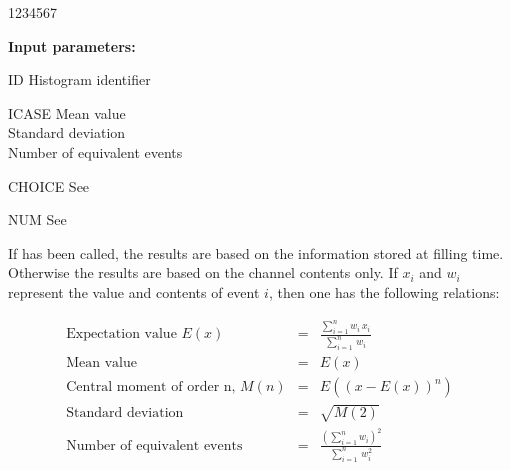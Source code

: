 \begin{DLtt}{1234567}
\item[{\rm\bf Input parameters:}]
\item[ID] Histogram identifier
\item[ICASE]  Mean value\\
              Standard deviation\\
              Number of equivalent events
\item[CHOICE] See 
\item[NUM] See 
\end{DLtt}
If 
has been called, the results are based on the
information stored at filling time.
Otherwise the results are based on the channel contents only.
If $x_i$ and $w_i$ represent the value and contents of event $i$, then
one has the following relations:

\bigskip

\begin{eqnarray*}
\mbox{Expectation value } E(x)          & = &
  \frac{\textstyle\sum_{i=1}^{n}w_i\, x_i}{\textstyle\sum_{i=1}^{n}\, w_i} \\
\mbox{Mean value}                       & = & E(x)                         \\
\mbox{Central moment of order n, } M(n) & = & E (( x - E(x))^n)            \\
\mbox{Standard deviation}               & = & \sqrt{M(2)}                  \\
\mbox{Number of equivalent events}      & = &
  \frac{\textstyle\left({\sum_{i=1}^n}{w_i}\right)^2}%
       {\textstyle\sum_{i=1}^n\, w_i^2}
\end{eqnarray*}

